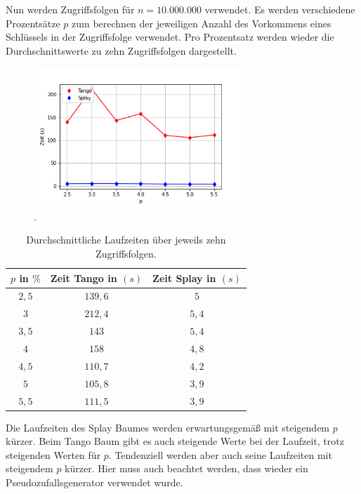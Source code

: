 \documentclass[a4paper,12pt]{article}
\begin{document}
\noindent Nun werden Zugriffsfolgen für $n = 10.000.000$ verwendet. Es werden verschiedene Prozentsätze $p$ zum berechnen der jeweiligen Anzahl des Vorkommens eines Schlüssels in der Zugriffsfolge verwendet. Pro Prozentsatz werden wieder die Durchschnittswerte zu zehn Zugriffsfolgen dargestellt. 
\begin{figure}[H]
	\centering
	\includegraphics[width=0.7\textwidth]{Medien/laufzeittest/diagramm/staticfinger4}
	\caption{.}
\end{figure}
\begin{table}[H]
	\begin{center}
		\begin{tabular}[c]{|c|c|c|}
			\hline
			$p$ in $\%$ & Zeit Tango in $\left(s\right)$ &Zeit Splay in $\left(s\right)$ \\
			\hline
			$2,5$  & $139,6$ &$5$  \\
			\hline
			$3$  &   $212,4$ &  $5,4$  \\
			\hline
			$3,5$  & $143$ &$5,4$  \\
			\hline
			$4$ &    $158$ &$4,8$ \\
			\hline
			$4,5$  & $110,7$ &$4,2$  \\
			\hline
			$5$  &   $105,8$ &  $3,9$  \\
			\hline
			$5,5$  & $111,5$ &$3,9$  \\
			\hline
		\end{tabular}
		\caption{Durchschnittliche Laufzeiten über jeweils zehn Zugriffsfolgen.} 
	\end{center}
\end{table}

\noindent Die Laufzeiten des Splay Baumes werden erwartungsgemäß mit steigendem $p$ kürzer. Beim Tango Baum gibt es auch steigende Werte bei der Laufzeit, trotz steigenden Werten für $p$. Tendenziell werden aber auch seine Laufzeiten mit steigendem $p$ kürzer. Hier muss auch beachtet werden, dass wieder ein Pseudozufallsgenerator verwendet wurde.
\end{document}
